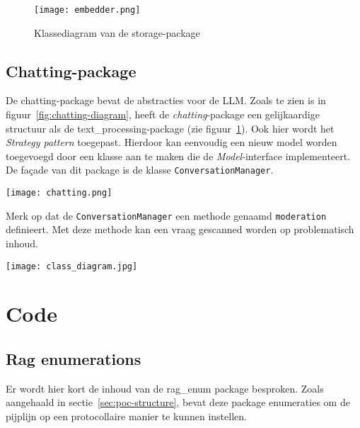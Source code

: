 \begin{figure}
    \centering
    \texttt{[image: embedder.png]}
    \caption[Klassediagram - storage-package]{\label{fig:storage-diagram}Klassediagram van de storage-package}
\end{figure}

\subsection{Chatting-package}%
\label{subsec:pckg-chattings}

De chatting-package bevat de abstracties voor de \acrshort{LLM}. Zoals te zien is in figuur~\ref{fig:chatting-diagram}, heeft de \textit{chatting}-package een gelijkaardige structuur als de text\_processing-package (zie figuur~\ref{fig:storage-diagram}). Ook hier wordt het \emph{Strategy pattern} toegepast. Hierdoor kan eenvoudig een nieuw model worden toegevoegd door een klasse aan te maken die de \emph{Model}-interface implementeert. De façade van dit package is de klasse \texttt{ConversationManager}.

\begin{sidewaysfigure}
    \centering
    \texttt{[image: chatting.png]}
    \caption[Klassediagram - chatting-package]{\label{fig:chatting-diagram}Klassediagram van de chatting-package}
\end{sidewaysfigure}

Merk op dat de \texttt{ConversationManager} een methode genaamd \texttt{moderation} definieert. Met deze methode kan een vraag gescanned worden op problematisch inhoud.

\begin{sidewaysfigure}
    \centering
    \texttt{[image: class\_diagram.jpg]}
    \caption[Klassediagram - PoC]{\label{fig:poc-diagram}Klassediagram van de gehele pijplijn}
\end{sidewaysfigure}


\section{Code}%
\label{sec:code}

\subsection{Rag enumerations}%
\label{subsec:ragenums}

Er wordt hier kort de inhoud van de rag\_enum package besproken. Zoals aangehaald in sectie~\ref{sec:poc-structure}, bevat deze package enumeraties om de pijplijn op een protocollaire manier te kunnen instellen.

